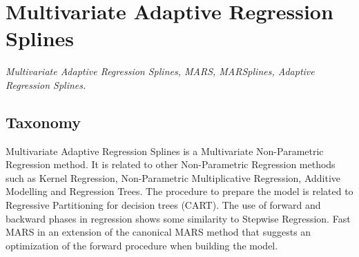 
\section{Multivariate Adaptive Regression Splines} 
\label{sec:mars}

\emph{Multivariate Adaptive Regression Splines, MARS, MARSplines, Adaptive Regression Splines.}

\subsection{Taxonomy}
Multivariate Adaptive Regression Splines is a Multivariate Non-Parametric Regression method.
It is related to other Non-Parametric Regression methods such as Kernel Regression, Non-Parametric Multiplicative Regression, Additive Modelling and Regression Trees. The procedure to prepare the model is related to Regressive Partitioning for decision trees (CART). The use of forward and backward phases in regression shows some similarity to Stepwise Regression.
Fast MARS in an extension of the canonical MARS method that suggests an optimization of the forward procedure when building the model.

